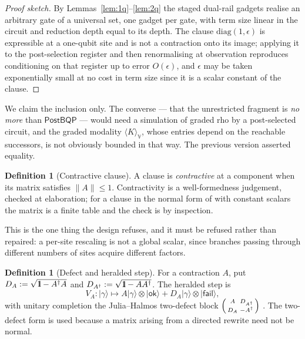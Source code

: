\documentclass[11pt,a4paper]{article}
\newcommand{\Id}{\mathrm{1}\hspace{-0.30em}\mathrm{l}}
\theoremstyle{plain}
\theoremstyle{definition}
\newtheorem{definition}[theorem]{Definition}
\theoremstyle{remark}
\newcommand{\V}{\mathbb{V}}
\newcommand{\ket}[1]{\lvert #1 \rangle}
\begin{document}
\begin{proof}[Proof sketch]
By Lemmas~\ref{lem:1q}--\ref{lem:2q} the staged dual-rail gadgets realise an
arbitrary gate of a universal set, one gadget per gate, with term size linear in
the circuit and reduction depth equal to its depth. The clause
$\mathrm{diag}(1,\epsilon)$ is expressible at a one-qubit site and is not a
contraction onto its image; applying it to the post-selection register and then
renormalising at observation reproduces conditioning on that register up to
error $O(\epsilon)$, and $\epsilon$ may be taken exponentially small at no cost
in term size since it is a scalar constant of the clause.
\end{proof}

We claim the inclusion only. The converse --- that the unrestricted fragment is
\emph{no more} than $\mathsf{PostBQP}$ --- would need a simulation of graded rho
by a post-selected circuit, and the graded modality
$\langle K \rangle_{\V}$, whose entries depend on the reachable successors, is
not obviously bounded in that way. The previous version asserted equality.

\begin{definition}[Contractive clause]\label{def:contractive}
A clause is \emph{contractive} at a component when its matrix satisfies
$\|A\| \leq 1$. Contractivity is a well-formedness judgement, checked at
elaboration; for a clause in the normal form of \cite{ResAlg} with constant
scalars the matrix is a finite table and the check is by inspection.
\end{definition}

This is the one thing the design refuses, and it must be refused rather than
repaired: a per-site rescaling is not a global scalar, since branches passing
through different numbers of sites acquire different factors.

\begin{definition}[Defect and heralded step]\label{def:heraldedstep}
For a contraction $A$, put $D_A := \sqrt{\Id - A^{\dagger}A}$ and
$D_{A^{\dagger}} := \sqrt{\Id - AA^{\dagger}}$. The heralded step is
\[
  V_A : \ket{\gamma} \longmapsto
    A\ket{\gamma}\otimes\ket{\mathsf{ok}}
    + D_A\ket{\gamma}\otimes\ket{\mathsf{fail}},
\]
with unitary completion the Julia--Halmos two-defect block
$\begin{psmallmatrix} A & D_{A^{\dagger}} \\ D_A & -A^{\dagger}\end{psmallmatrix}$
\cite{SzNagyFoias}. The two-defect form is used because a matrix arising from a
directed rewrite need not be normal.
\end{definition}
\end{document}
